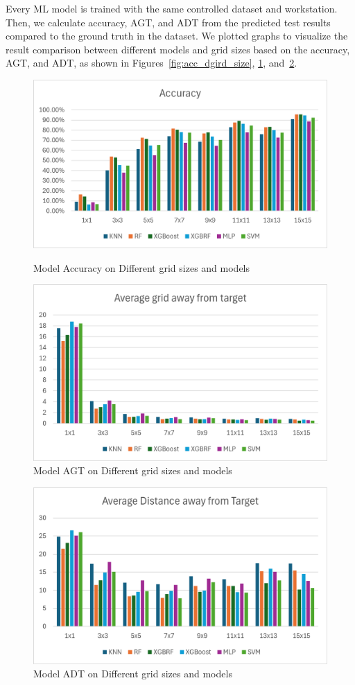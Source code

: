 \documentclass[runningheads]{llncs}
\begin{document}
Every ML model is trained with the same controlled dataset and workstation. Then, we calculate accuracy, AGT, and ADT from the predicted test results compared to the ground truth in the dataset. We plotted graphs to visualize the result comparison between different models and grid sizes based on the accuracy, AGT, and ADT, as shown in Figures~\ref{fig:acc_dgird_size}, \ref{fig:AGT_dgrid_size}, and~\ref{fig:ADT_dgrid_size}.

\begin{figure}[thb!]
	\begin{minipage}{0.45\linewidth}
		\centering
		\includegraphics[width=\linewidth]{figures/image3.png}
		\caption{Model Accuracy on Different grid sizes and models}
		\label{fig:acc_dgird_size}
	\end{minipage}
	\hfill
	\begin{minipage}{0.45\linewidth}
		\centering
		\includegraphics[width=\linewidth]{figures/image1.png}
		\caption{Model AGT on Different grid sizes and models}
		\label{fig:AGT_dgrid_size}
	\end{minipage}
\end{figure}
\begin{figure}[thb!]
        \centering
        \includegraphics[width=.45\linewidth]{figures/image2.png}
        \caption{Model ADT on Different grid sizes and models}
        \label{fig:ADT_dgrid_size}
\end{figure}
\end{document}
